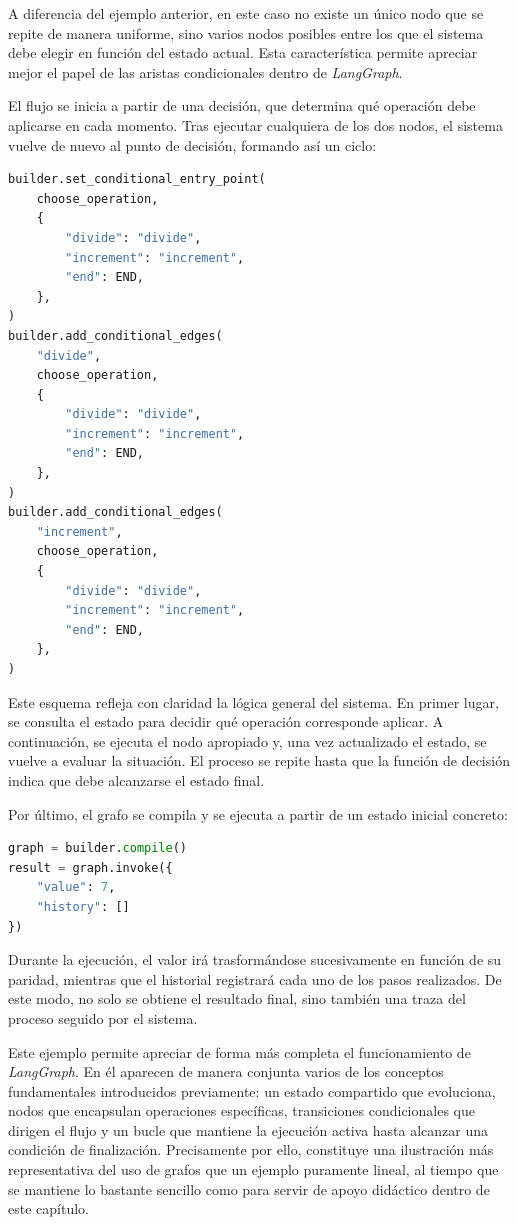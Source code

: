 \documentclass[12pt,a4paper,twoside,openright]{book}
\begin{document}
A diferencia del ejemplo anterior, en este caso no existe un único nodo que se repite de manera uniforme, sino varios nodos posibles entre los que el sistema debe elegir en función del estado actual. Esta característica permite apreciar mejor el
papel de las aristas condicionales dentro de \emph{LangGraph}.

El flujo se inicia a partir de una decisión, que determina qué operación debe aplicarse en cada momento. Tras ejecutar cualquiera de los dos nodos, el sistema vuelve de nuevo al punto de decisión, formando así un ciclo:

\begin{lstlisting}[language=Python, caption={Flujo de ejecución}]
builder.set_conditional_entry_point(
    choose_operation,
    {
        "divide": "divide",
        "increment": "increment",
        "end": END,
    },
)
builder.add_conditional_edges(
    "divide",
    choose_operation,
    {
        "divide": "divide",
        "increment": "increment",
        "end": END,
    },
)
builder.add_conditional_edges(
    "increment",
    choose_operation,
    {
        "divide": "divide",
        "increment": "increment",
        "end": END,
    },
)
\end{lstlisting}

Este esquema refleja con claridad la lógica general del sistema. En primer lugar, se consulta el estado para decidir qué operación corresponde aplicar. A continuación, se ejecuta el nodo apropiado y, una vez actualizado el estado, se
vuelve a evaluar la situación. El proceso se repite hasta que la función de decisión indica que debe alcanzarse el estado final.

Por último, el grafo se compila y se ejecuta a partir de un estado inicial concreto:

\begin{lstlisting}[language=Python, caption={Ejecución de estado inicial}]
graph = builder.compile()
result = graph.invoke({
    "value": 7,
    "history": []
})
\end{lstlisting}

Durante la ejecución, el valor irá trasformándose sucesivamente en función de su paridad, mientras que el historial registrará cada uno de los pasos realizados. De este modo, no solo se obtiene el resultado final, sino también
una traza del proceso seguido por el sistema.

Este ejemplo permite apreciar de forma más completa el funcionamiento de \emph{LangGraph}. En él aparecen de manera conjunta varios de los conceptos fundamentales introducidos previamente: un estado compartido que evoluciona, nodos
que encapsulan operaciones específicas, transiciones condicionales que dirigen el flujo y un bucle que mantiene la ejecución activa hasta alcanzar una condición de finalización. Precisamente por ello, constituye una ilustración más
representativa del uso de grafos que un ejemplo puramente lineal, al tiempo que se mantiene lo bastante sencillo como para servir de apoyo didáctico dentro de este capítulo.
\end{document}

